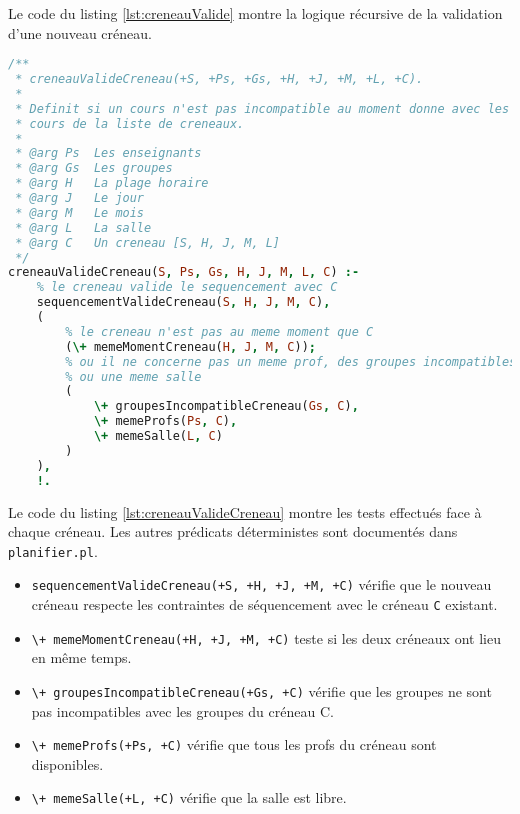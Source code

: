 Le code du listing \ref{lst:creneauValide} montre la logique récursive de la
validation d'une nouveau créneau.

\begin{lstlisting}[language=Prolog, caption=creneauValide, captionpos=b,
label={lst:creneauValideCreneau}]
/**
 * creneauValideCreneau(+S, +Ps, +Gs, +H, +J, +M, +L, +C).
 *
 * Definit si un cours n'est pas incompatible au moment donne avec les autres
 * cours de la liste de creneaux.
 *
 * @arg Ps  Les enseignants
 * @arg Gs  Les groupes
 * @arg H   La plage horaire
 * @arg J   Le jour
 * @arg M   Le mois
 * @arg L   La salle
 * @arg C   Un creneau [S, H, J, M, L]
 */
creneauValideCreneau(S, Ps, Gs, H, J, M, L, C) :-
    % le creneau valide le sequencement avec C
    sequencementValideCreneau(S, H, J, M, C),
    (
        % le creneau n'est pas au meme moment que C
        (\+ memeMomentCreneau(H, J, M, C));
        % ou il ne concerne pas un meme prof, des groupes incompatibles
        % ou une meme salle
        (
            \+ groupesIncompatibleCreneau(Gs, C),
            \+ memeProfs(Ps, C),
            \+ memeSalle(L, C)
        )
    ),
    !.
\end{lstlisting}

Le code du listing \ref{lst:creneauValideCreneau} montre les tests effectués
face à chaque créneau. Les autres prédicats déterministes sont documentés dans
\texttt{planifier.pl}.

\begin{itemize}

    \item \texttt{sequencementValideCreneau(+S, +H, +J, +M, +C)} vérifie que
        le nouveau créneau respecte les contraintes de séquencement avec le
        créneau \texttt{C} existant.

    \item \texttt{\textbackslash+ memeMomentCreneau(+H, +J, +M, +C)} teste si
        les deux créneaux ont lieu en même temps.

    \item \texttt{\textbackslash+ groupesIncompatibleCreneau(+Gs, +C)} vérifie
        que les groupes ne sont pas incompatibles avec les groupes du créneau C.

    \item \texttt{\textbackslash+ memeProfs(+Ps, +C)} vérifie que tous les profs
        du créneau sont disponibles.

    \item \texttt{\textbackslash+ memeSalle(+L, +C)} vérifie que la salle est
        libre.

\end{itemize}



